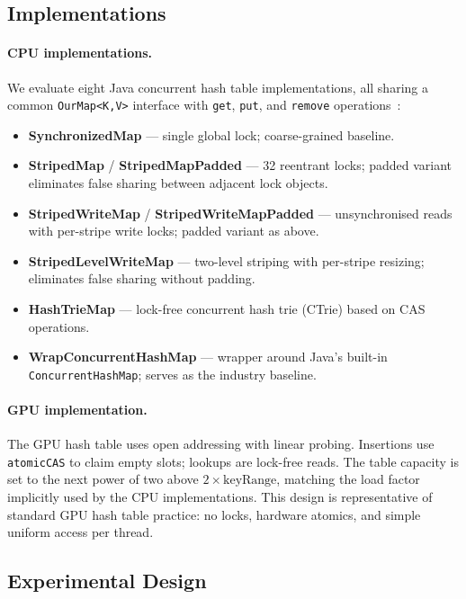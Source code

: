 \documentclass[11pt,a4paper]{article}
\begin{document}
\subsection{Implementations}

\paragraph{CPU implementations.} We evaluate eight Java concurrent hash table
implementations, all sharing a common \texttt{OurMap\textless K,V\textgreater}
interface with \texttt{get}, \texttt{put}, and \texttt{remove} operations~\cite{sestoft2025}:

\begin{itemize}
  \item \textbf{SynchronizedMap} --- single global lock; coarse-grained baseline.
  \item \textbf{StripedMap} / \textbf{StripedMapPadded} --- 32 reentrant locks;
        padded variant eliminates false sharing between adjacent lock objects.
  \item \textbf{StripedWriteMap} / \textbf{StripedWriteMapPadded} --- unsynchronised
        reads with per-stripe write locks; padded variant as above.
  \item \textbf{StripedLevelWriteMap} --- two-level striping with per-stripe
        resizing; eliminates false sharing without padding.
  \item \textbf{HashTrieMap} --- lock-free concurrent hash trie (CTrie) based on
        CAS operations.
  \item \textbf{WrapConcurrentHashMap} --- wrapper around Java's built-in
        \texttt{ConcurrentHashMap}; serves as the industry baseline.
\end{itemize}

\paragraph{GPU implementation.} The GPU hash table uses open addressing with
linear probing. Insertions use \texttt{atomicCAS} to claim empty slots;
lookups are lock-free reads. The table capacity is set to the next power of
two above $2 \times \text{keyRange}$, matching the load factor implicitly
used by the CPU implementations. This design is representative of standard
GPU hash table practice: no locks, hardware atomics, and simple uniform
access per thread.

\subsection{Experimental Design}
\end{document}
